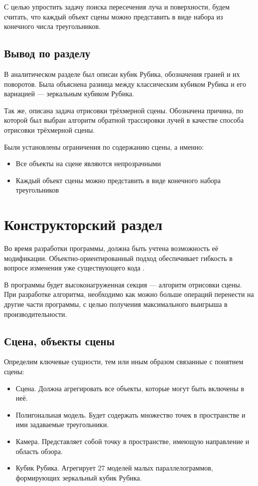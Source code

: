 С целью упростить задачу поиска пересечения луча и поверхности, будем считать, что каждый объект сцены можно представить в виде набора из конечного числа треугольников.

\subsection{Вывод по разделу}
В аналитическом разделе был описан кубик Рубика, обозначения граней и их поворотов. Была объяснена разница между классическим кубиком Рубика и его вариацией --- зеркальным кубиком Рубика.

Так же, описана задача отрисовки трёхмерной сцены. Обозначена причина, по которой был выбран алгоритм обратной трассировки лучей в качестве способа отрисовки трёхмерной сцены.

Были установлены ограничения по содержанию сцены, а именно:
\begin{itemize}
	\item Все объекты на сцене являются непрозрачными
	\item Каждый объект сцены можно представить в виде конечного набора треугольников
\end{itemize}
	
\section{Конструкторский раздел}
Во время разработки программы, должна быть учтена возможность её модификации. Объектно-ориентированный подход обеспечивает гибкость в вопросе изменения уже существующего кода \cite{bib:oop_mod}.

В программы будет высоконагруженная секция --- алгоритм отрисовки сцены. При разработке алгоритма, необходимо как можно больше операций перенести на другие части программы, с целью получения максимального выигрыша в производительности.

\subsection{Сцена, объекты сцены}
Определим ключевые сущности, тем или иным образом связанные с понятием сцены:
\begin{itemize}
	\item Сцена. Должна агрегировать все объекты, которые могут быть включены в неё.
	\item Полигональная модель. Будет содержать множество точек в пространстве и ими задаваемые треугольники.
	\item Камера. Представляет собой точку в пространстве, имеющую направление и область обзора.
	\item Кубик Рубика. Агрегирует 27 моделей малых параллелограммов, формирующих зеркальный кубик Рубика.
\end{itemize}

